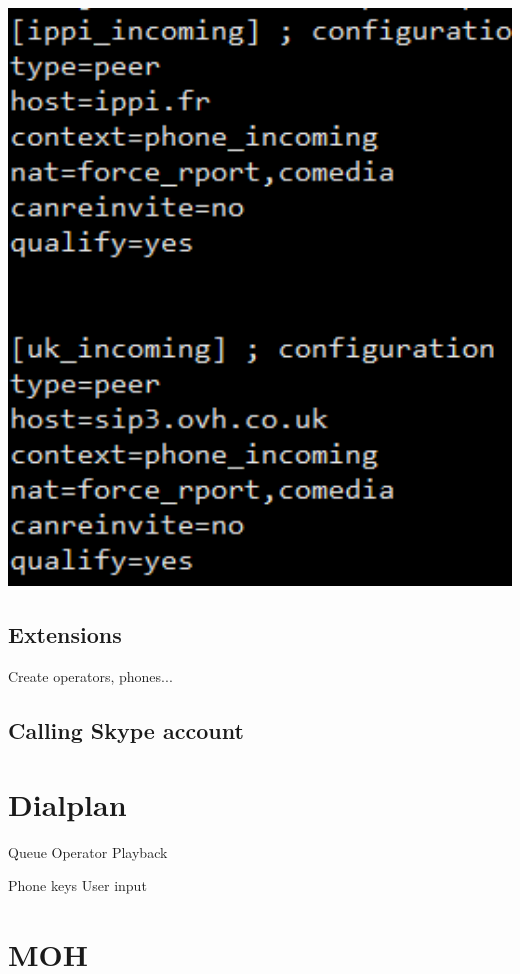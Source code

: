 \includegraphics[width=1\textwidth]{img/contextsphones.png}

\subsection{Extensions}
Create operators, phones...

\subsection{Calling Skype account}


\section{Dialplan}

Queue
Operator
Playback

Phone keys
User input


\section{MOH}
 